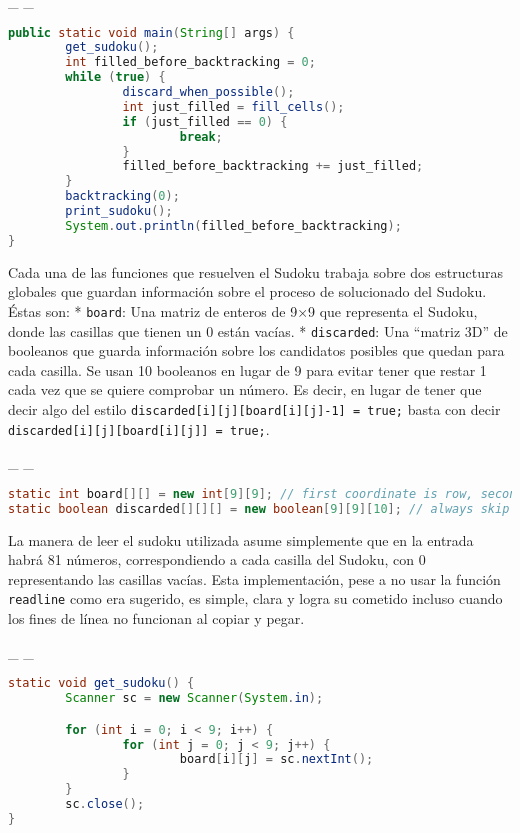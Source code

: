\documentclass[
  spanish,
  a4paper,
,tablecaptionabove
]{scrartcl}
\newcommand{\passthrough}[1]{#1}
\begin{document}
\_ \_

\begin{lstlisting}[language=Java]
public static void main(String[] args) {
        get_sudoku();
        int filled_before_backtracking = 0;
        while (true) {
                discard_when_possible();
                int just_filled = fill_cells();
                if (just_filled == 0) {
                        break;
                }
                filled_before_backtracking += just_filled;
        }
        backtracking(0);
        print_sudoku();
        System.out.println(filled_before_backtracking);
}
\end{lstlisting}

Cada una de las funciones que resuelven el Sudoku trabaja sobre dos
estructuras globales que guardan información sobre el proceso de
solucionado del Sudoku. Éstas son: * \passthrough{\lstinline!board!}:
Una matriz de enteros de 9×9 que representa el Sudoku, donde las
casillas que tienen un 0 están vacías. *
\passthrough{\lstinline!discarded!}: Una \enquote{matriz 3D} de
booleanos que guarda información sobre los candidatos posibles que
quedan para cada casilla. Se usan 10 booleanos en lugar de 9 para evitar
tener que restar 1 cada vez que se quiere comprobar un número. Es decir,
en lugar de tener que decir algo del estilo
\passthrough{\lstinline!discarded[i][j][board[i][j]-1] = true;!} basta
con decir
\passthrough{\lstinline!discarded[i][j][board[i][j]] = true;!}.

\_ \_

\begin{lstlisting}[language=Java]
static int board[][] = new int[9][9]; // first coordinate is row, second is column
static boolean discarded[][][] = new boolean[9][9][10]; // always skip the first one
\end{lstlisting}

La manera de leer el sudoku utilizada asume simplemente que en la
entrada habrá 81 números, correspondiendo a cada casilla del Sudoku, con
0 representando las casillas vacías. Esta implementación, pese a no usar
la función \passthrough{\lstinline!readline!} como era sugerido, es
simple, clara y logra su cometido incluso cuando los fines de línea no
funcionan al copiar y pegar.

\newpage
\_ \_

\begin{lstlisting}[language=Java]
static void get_sudoku() {
        Scanner sc = new Scanner(System.in);

        for (int i = 0; i < 9; i++) {
                for (int j = 0; j < 9; j++) {
                        board[i][j] = sc.nextInt();
                }
        }
        sc.close();
}
\end{lstlisting}
\end{document}

